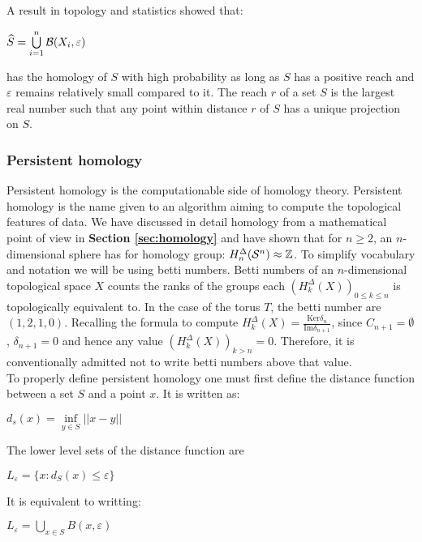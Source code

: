 \documentclass[12pt, a4paper]{article}
\begin{document}
A result in topology and statistics showed that:
\begin{center}
  $\widehat{S} = \bigcup\limits_{i=1}^{n}\mathcal{B}(X_i,\varepsilon)$
\end{center}

has the homology of $S$ with high probability as long as $S$ has a positive reach and $\varepsilon$ remains relatively small compared to it. The reach $r$ of a set $S$ is the largest real number such that any point within distance $r$ of $S$ has a unique projection on $S$.

\subsubsection{Persistent homology}

Persistent homology is the computationable side of homology theory. Persistent homology is the name given to an algorithm aiming to compute the topological features of data. We have discussed in detail homology from a mathematical point of view in \textbf{Section \ref{sec:homology}} and have shown that for $n \ge 2$, an $n$-dimensional sphere has for homology group: $H_n^\Delta(\mathcal{S}^n) \approx \mathbb{Z}$. To simplify vocabulary and notation we will be using betti numbers. Betti numbers of an $n$-dimensional topological space $X$ counts the ranks of the groups each $(H_k^\Delta(X))_{0 \le k \le n}$ is topologically equivalent to. In the case of the torus $T$, the betti number are $(1,2,1,0)$. Recalling the formula to compute $H_k^\Delta(X) = \frac{\text{Ker} \delta_n}{\text{Im} \delta_{n+1}}$, since $C_{n+1} = \emptyset$, $\delta_{n+1} = 0$ and hence any value $(H_k^\Delta(X))_{k > n} = 0$. Therefore, it is conventionally admitted not to write betti numbers above that value.\\

To properly define persistent homology one must first define the distance function between a set $S$ and a point $x$. It is written as:
\begin{center}
  $d_s(x) = \inf\limits_{y\in S} ||x-y||$  
\end{center}

The lower level sets of the distance function are

\begin{center}
  $L_\varepsilon = \lbrace x : d_S(x) \le \varepsilon \rbrace$
\end{center}

It is equivalent to writting:

\begin{center}
  $L_\varepsilon = \bigcup\limits_{x \in S} B(x,\varepsilon)$ 
\end{center}
\end{document}
